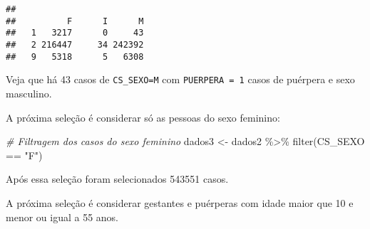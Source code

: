 \documentclass[
]{article}
\newenvironment{Shaded}{\begin{snugshade}}{\end{snugshade}}
\newcommand{\AttributeTok}[1]{\textcolor[rgb]{0.77,0.63,0.00}{#1}}
\newcommand{\CommentTok}[1]{\textcolor[rgb]{0.56,0.35,0.01}{\textit{#1}}}
\newcommand{\DecValTok}[1]{\textcolor[rgb]{0.00,0.00,0.81}{#1}}
\newcommand{\FunctionTok}[1]{\textcolor[rgb]{0.00,0.00,0.00}{#1}}
\newcommand{\NormalTok}[1]{#1}
\newcommand{\OtherTok}[1]{\textcolor[rgb]{0.56,0.35,0.01}{#1}}
\newcommand{\SpecialCharTok}[1]{\textcolor[rgb]{0.00,0.00,0.00}{#1}}
\newcommand{\StringTok}[1]{\textcolor[rgb]{0.31,0.60,0.02}{#1}}
\begin{document}
\begin{Shaded}
\end{Shaded}

\begin{verbatim}
##    
##          F      I      M
##   1   3217      0     43
##   2 216447     34 242392
##   9   5318      5   6308
\end{verbatim}

Veja que há 43 casos de \texttt{CS\_SEXO=M} com \texttt{PUERPERA\ =\ 1}
casos de puérpera e sexo masculino.

A próxima seleção é considerar só as pessoas do sexo feminino:

\begin{Shaded}
\begin{Highlighting}[]
\CommentTok{\# Filtragem dos casos do sexo feminino}
\NormalTok{dados3 }\OtherTok{\textless{}{-}}\NormalTok{ dados2 }\SpecialCharTok{\%\textgreater{}\%} 
  \FunctionTok{filter}\NormalTok{(CS\_SEXO }\SpecialCharTok{==} \StringTok{"F"}\NormalTok{)}
\end{Highlighting}
\end{Shaded}

Após essa seleção foram selecionados 543551 casos.

A próxima seleção é considerar gestantes e puérperas com idade maior que
10 e menor ou igual a 55 anos.

\begin{Shaded}
\end{Shaded}
\end{document}
